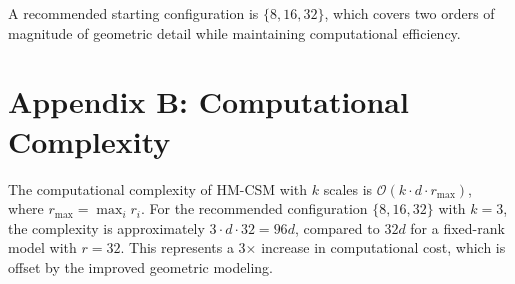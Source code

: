 \documentclass[12pt]{article}
\begin{document}
A recommended starting configuration is $\{8, 16, 32\}$, which covers two orders of magnitude of geometric detail while maintaining computational efficiency.

\section*{Appendix B: Computational Complexity}

The computational complexity of HM-CSM with $k$ scales is $\mathcal{O}(k \cdot d \cdot r_{\max})$, where $r_{\max} = \max_i r_i$. For the recommended configuration $\{8, 16, 32\}$ with $k=3$, the complexity is approximately $3 \cdot d \cdot 32 = 96d$, compared to $32d$ for a fixed-rank model with $r=32$. This represents a 3$\times$ increase in computational cost, which is offset by the improved geometric modeling.
\end{document}
